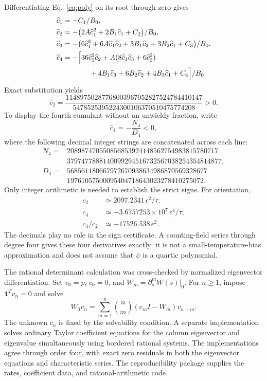 \documentclass[aps,pre,10pt,onecolumn,notitlepage,longbibliography,amsmath,amssymb]{revtex4-2}
\begin{document}
Differentiating Eq.~\eqref{eq:poly} on its root through zero gives
\begin{align}
 \widehat c_1&=-C_1/B_0,\\
 \widehat c_2&=-\big(2A\widehat c_1^2+2B_1\widehat c_1+C_2\big)/B_0,\\
 \widehat c_3&=-\big(6\widehat c_1^3+6A\widehat c_1\widehat c_2
 +3B_1\widehat c_2+3B_2\widehat c_1+C_3\big)/B_0,\\
 \widehat c_4&=-\Big[36\widehat c_1^2\widehat c_2
 +A(8\widehat c_1\widehat c_3+6\widehat c_2^2)\nonumber\\
 &\hspace{1.3cm}+4B_1\widehat c_3+6B_2\widehat c_2+4B_3\widehat c_1+C_4\Big]/B_0.
\end{align}
Exact substitution yields
\begin{equation}
 \widehat c_2=\frac{11489750287768003967052827524784410147}
 {5478525395224300106370510475774208}>0.
\end{equation}
To display the fourth cumulant without an unwieldy fraction, write
\begin{equation}
 \widehat c_4=-\frac{N_4}{D_4}<0,
\end{equation}
where the following decimal integer strings are concatenated across each line:
\begin{align}
 N_4={}&208987470550856853924148562754983815780717\nonumber\\
      &3797477888140099294516732567038254354814877,\\
 D_4={}&568561180667972670938634986870569328677\nonumber\\
      &19761057500095404718643023278410275072.
\end{align}
Only integer arithmetic is needed to establish the strict signs. For orientation,
\begin{align}
 c_2&\simeq2097.2341\,\epsilon^2/\tau,\\
 c_4&\simeq-3.6757253\times10^7\,\epsilon^4/\tau,\\
 c_4/c_2&\simeq-17526.538\,\epsilon^2.
\end{align}
The decimals play no role in the sign certificate. A counting-field series through degree four gives these four derivatives exactly: it is not a small-temperature-bias approximation and does not assume that $\psi$ is a quartic polynomial.

The rational determinant calculation was cross-checked by normalized eigenvector differentiation. Set $v_0=p$, $c_0=0$, and $W_m=\partial_s^mW(s)|_0$. For $n\geq1$, impose $\boldsymbol{1}^Tv_n=0$ and solve
\begin{equation}
 W_0v_n=\sum_{m=1}^n\binom{n}{m}(c_mI-W_m)v_{n-m}.
\end{equation}
The unknown $c_n$ is fixed by the solvability condition. A separate implementation solves ordinary Taylor coefficient equations for the column eigenvector and eigenvalue simultaneously using bordered rational systems. The implementations agree through order four, with exact zero residuals in both the eigenvector equations and characteristic series. The reproducibility package supplies the rates, coefficient data, and rational-arithmetic code.
\end{document}
